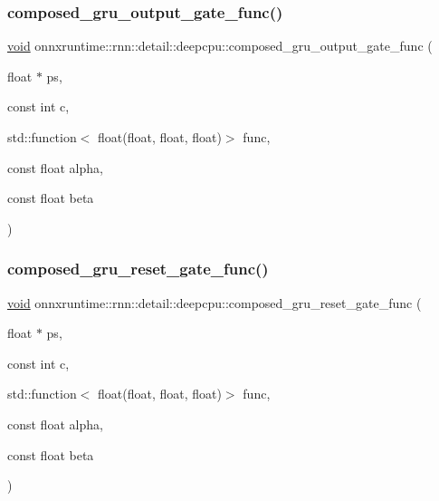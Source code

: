 \subsubsection{\texorpdfstring{composed\+\_\+gru\+\_\+output\+\_\+gate\+\_\+func()}{composed\_gru\_output\_gate\_func()}}
{\footnotesize\ttfamily \mbox{\hyperlink{mlasi_8h_a88f941d423cb2a819b70a1358982b1a6}{void}} onnxruntime\+::rnn\+::detail\+::deepcpu\+::composed\+\_\+gru\+\_\+output\+\_\+gate\+\_\+func (\begin{DoxyParamCaption}\item[{float $\ast$}]{ps,  }\item[{const int}]{c,  }\item[{std\+::function$<$ float(float, float, float)$>$}]{func,  }\item[{const float}]{alpha,  }\item[{const float}]{beta }\end{DoxyParamCaption})}

\mbox{\label{namespaceonnxruntime_1_1rnn_1_1detail_1_1deepcpu_a26f2b2ed3d836a627d6173913d935a00}} 
\subsubsection{\texorpdfstring{composed\+\_\+gru\+\_\+reset\+\_\+gate\+\_\+func()}{composed\_gru\_reset\_gate\_func()}}
{\footnotesize\ttfamily \mbox{\hyperlink{mlasi_8h_a88f941d423cb2a819b70a1358982b1a6}{void}} onnxruntime\+::rnn\+::detail\+::deepcpu\+::composed\+\_\+gru\+\_\+reset\+\_\+gate\+\_\+func (\begin{DoxyParamCaption}\item[{float $\ast$}]{ps,  }\item[{const int}]{c,  }\item[{std\+::function$<$ float(float, float, float)$>$}]{func,  }\item[{const float}]{alpha,  }\item[{const float}]{beta }\end{DoxyParamCaption})}

\mbox{\label{namespaceonnxruntime_1_1rnn_1_1detail_1_1deepcpu_ae0681862958cc7ac5a8b2f361cc4a800}} 

